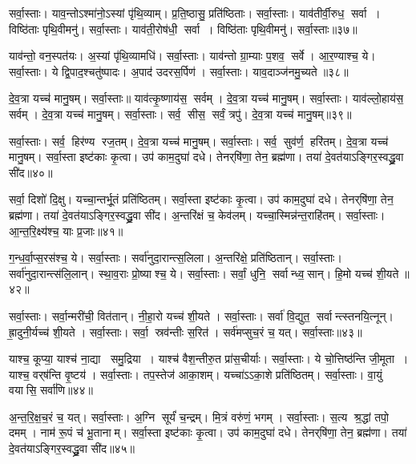    सर्वा॒स्ताः।
   याव॒न्तोऽश्मा॑नो॒ऽस्यां पृ॑थि॒व्याम्।
   प्र॒ति॒ष्ठासु॒ प्रति॑ष्ठिताः।
   सर्वा॒स्ताः।
   याव॑तीर्वी॒रुध॒ सर्वा।
   विष्ठि॑ताः पृथि॒वीमनु॑।
   सर्वा॒स्ताः।
   याव॑ती॒रोष॑धी॒ सर्वा।
   विष्ठि॑ताः पृथि॒वीमनु॑।
   सर्वा॒स्ताः॥३७॥

   याव॑न्तो॒ वन॒स्पत॑यः।
   अ॒स्यां पृ॑थि॒व्यामधि॑।
   सर्वा॒स्ताः।
   याव॑न्तो ग्रा॒म्याः प॒शव॒ सर्वे।
   आ॒र॒ण्याश्च॒ ये।
   सर्वा॒स्ताः।
   ये द्वि॒पाद॒श्चतु॑ष्पादः।
   अ॒पाद॑ उदरस॒र्पिण॑।
   सर्वा॒स्ताः।
   याव॒दाञ्ज॑नमु॒च्यते॥३८॥

   दे॒व॒त्रा यच्च॑ मानु॒षम्।
   सर्वा॒स्ताः॥
   याव॑त्कृ॒ष्णाय॑स॒ सर्वम्।
   दे॒व॒त्रा यच्च॑ मानु॒षम्।
   सर्वा॒स्ताः।
   याव॑ल्लो॒हाय॑स॒ सर्वम्।
   दे॒व॒त्रा यच्च॑ मानु॒षम्।
   सर्वा॒स्ताः।
   सर्व॒ सीस॒ सर्वं॒ त्रपु॑।
   दे॒व॒त्रा यच्च॑ मानु॒षम्॥३९॥

   सर्वा॒स्ताः।
   सर्व॒ हिर॑ण्य रज॒तम्।
   दे॒व॒त्रा यच्च॑ मानु॒षम्।
   सर्वा॒स्ताः।
   सर्व॒ सुव॑र्ण॒ हरि॑तम्।
   दे॒व॒त्रा यच्च॑ मानु॒षम्।
   सर्वा॒स्ता इष्ट॑काः कृ॒त्वा।
   उप॑ काम॒दुघा॑ दधे।
   तेनर्‌षि॑णा॒ तेन॒ ब्रह्म॑णा।
   तया॑ दे॒वत॑याऽङ्गिर॒स्वद्ध्रु॒वा सी॑द॥४०॥
   \anuvakamend
  
   सर्वा॒ दिशो॑ दि॒क्षु।
   यच्चा॒न्तर्भू॒तं प्रति॑ष्ठितम्।
   सर्वा॒स्ता इष्ट॑काः कृ॒त्वा।
   उप॑ काम॒दुघा॑ दधे।
   तेनर्‌षि॑णा॒ तेन॒ ब्रह्म॑णा।
   तया॑ दे॒वत॑याऽङ्गिर॒स्वद्ध्रु॒वा सी॑द।
   अ॒न्तरि॑क्षं च॒ केव॑लम्।
   यच्चा॒स्मिन्न॑न्त॒राहि॑तम्।
   सर्वा॒स्ताः।
   आ॒न्त॒रि॒क्ष्य॑श्च॒ याः प्र॒जाः॥४१॥

   ग॒न्ध॒र्वा॒प्स॒रस॑श्च॒ ये।
   सर्वा॒स्ताः।
   सर्वा॑नुदा॒रान्त्स॒लिला\sn{}।
   अ॒न्तरि॑क्षे॒ प्रति॑ष्ठितान्।
   सर्वा॒स्ताः।
   सर्वा॑नुदा॒रान्त्स॑लि॒लान्।
   स्था॒व॒राः प्रो॒ष्याश्च॒ ये।
   सर्वा॒स्ताः।
   सर्वां॒ धुनि॒ सर्वान्ध्व॒सान्।
   हि॒मो यच्च॑ शी॒यते॥४२॥

   सर्वा॒स्ताः।
   सर्वा॒न्मरी॑ची॒\an{} वित॑तान्।
   नी॒हा॒रो यच्च॑ शी॒यते।
   सर्वा॒स्ताः।
   सर्वा॑ वि॒द्युत॒ सर्वान्त्स्तनयि॒त्नून्।
   ह्रा॒दुनी॒र्यच्च॑ शी॒यते।
   सर्वा॒स्ताः।
   सर्वा॒ स्रव॑न्तीः स॒रित॑।
   सर्व॑मप्सुच॒रं च॒ यत्।
   सर्वा॒स्ताः॥४३॥

   याश्च॒ कूप्या॒ याश्च॑ ना॒द्या समु॒द्रिया।
   याश्च॑ वैश॒न्तीरु॒त प्रा॑स॒चीर्याः।
   सर्वा॒स्ताः।
   ये चो॒त्तिष्ठ॑न्ति जी॒मूता।
   याश्च॒ वर्‌ष॑न्ति वृ॒ष्टय॑।
   सर्वा॒स्ताः।
   तप॒स्तेज॑ आका॒शम्।
   यच्चा॑ऽऽका॒शे प्रति॑ष्ठितम्।
   सर्वा॒स्ताः।
   वा॒युं वयासि॒ सर्वा॑णि॥४४॥

   अ॒न्त॒रि॒क्ष॒च॒रं च॒ यत्।
   सर्वा॒स्ताः।
   अ॒ग्नि सूर्यं॑ च॒न्द्रम्।
   मि॒त्रं वरु॑णं॒ भगम्।
   सर्वा॒स्ताः।
   स॒त्य श्र॒द्धां तपो॒ दमम्।
   नाम॑ रू॒पं च॑ भू॒तानाम्।
   सर्वा॒स्ता इष्ट॑काः कृ॒त्वा।
   उप॑ काम॒दुघा॑ दधे।
   तेनर्‌षि॑णा॒ तेन॒ ब्रह्म॑णा।
   तया॑ दे॒वत॑याऽङ्गिर॒स्वद्ध्रु॒वा सी॑द॥४५॥
\anuvakamend
  
